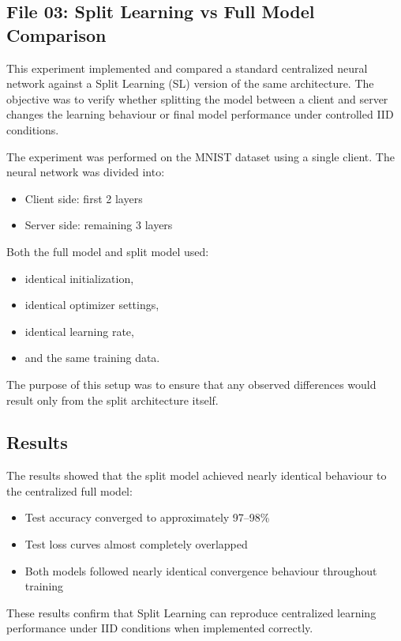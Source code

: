 \subsection*{File 03: Split Learning vs Full Model Comparison}

This experiment implemented and compared a standard centralized neural network against a Split Learning (SL) version of the same architecture. The objective was to verify whether splitting the model between a client and server changes the learning behaviour or final model performance under controlled IID conditions.

The experiment was performed on the MNIST dataset using a single client. The neural network was divided into:
\begin{itemize}
    \item Client side: first 2 layers
    \item Server side: remaining 3 layers
\end{itemize}

Both the full model and split model used:
\begin{itemize}
    \item identical initialization,
    \item identical optimizer settings,
    \item identical learning rate,
    \item and the same training data.
\end{itemize}

The purpose of this setup was to ensure that any observed differences would result only from the split architecture itself.

\subsection*{Results}

The results showed that the split model achieved nearly identical behaviour to the centralized full model:
\begin{itemize}
    \item Test accuracy converged to approximately 97--98\%
    \item Test loss curves almost completely overlapped
    \item Both models followed nearly identical convergence behaviour throughout training
\end{itemize}

These results confirm that Split Learning can reproduce centralized learning performance under IID conditions when implemented correctly.


